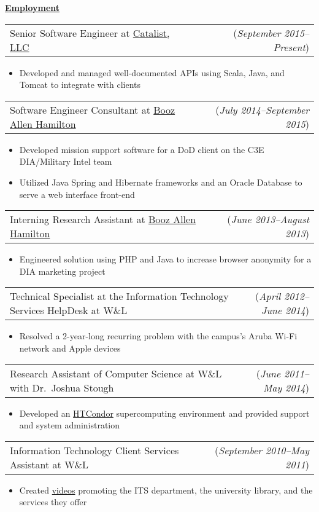 \documentclass[11pt, letterpaper]{letter}
\makeatletter
\newlength{\indwidth}            \setlength{\indwidth}{\textwidth-.4in}
\newlength{\listSpacing}         \setlength{\listSpacing}{.0375in}
\newlength{\headerAntispace}     \setlength{\headerAntispace}{-6pt}
\newlength{\subListAntispace}    \setlength{\subListAntispace}{-.25in}
\newlength{\subListMidAntispace} \setlength{\subListMidAntispace}{-2.5pt}
\newlength{\subListEndAntispace} \setlength{\subListEndAntispace}{-.075in}
\newcommand{\lst}[1]{
    \vspace{\subListAntispace}
    \begin{itemize}
        \item #1
    \end{itemize}
    \vspace{\subListEndAntispace}
}
\newcommand{\dated}[2]{
    \begin{tabular*}{\indwidth}{l@{\extracolsep{\fill}}r}
        #1 & (\textit{#2})
    \end{tabular*}
}
\newcommand{\datedTwo}[3]{
    \begin{tabular*}{\indwidth}{l@{\extracolsep{\fill}}r}
        #1 & (\textit{#2}) (\textit{#3})
    \end{tabular*}
}
\newcommand{\myul}[3]{
    \begingroup
        \renewcommand{\ULdepth}{#1}
        \renewcommand{\ULthickness}{#2}
        \uline{#3}
    \endgroup
}
\newcommand{\sectionheader}[1]{
    \myul{2.7pt}{0.5pt}{\large \textbf{#1}}
}
\newcommand{\BAHlink}{\href{https://www.boozallen.com/}{Booz Allen Hamilton}}
\makeatother
\begin{document}

\sectionheader{Employment}
\vspace{\headerAntispace}
\begin{itemize}{%
    \setlength{\itemsep}{\listSpacing}
    \item \dated{Senior Software Engineer at \href{https://catalist.us/}{Catalist, LLC}}{September 2015--Present}
    \lst{%
        Developed and managed well-documented APIs using Scala, Java, and Tomcat to integrate with clients
    }
    \item \dated{%
            Software Engineer Consultant at \BAHlink{}
    }{July 2014--September 2015}
    \lst{%
        Developed mission support software for a DoD client on the C3E DIA/Military Intel team
    \vspace{\subListMidAntispace}
    \item {%
        Utilized Java Spring and Hibernate frameworks and an Oracle Database to serve a web interface front-end
    }
    \vspace{\subListMidAntispace}
    }
    \item \dated{%
        Interning Research Assistant at \BAHlink{}
    }{June 2013--August 2013}
    \lst{%
        Engineered solution using PHP and Java to increase browser anonymity for a DIA marketing project
    }
    \item \dated{%
        Technical Specialist at the Information Technology Services HelpDesk at W\&L
    }{April 2012--June 2014}
    \lst{%
        Resolved a 2-year-long recurring problem with the campus's Aruba Wi-Fi network and Apple devices
    }
    \item \dated{%
        Research Assistant of Computer Science at W\&L with Dr.\ Joshua Stough
    }{June 2011--May 2014}
    \lst{%
        Developed an \href{http://www.htcondorproject.org/}{HTCondor} supercomputing environment and provided support
        and system administration
    }
    \item \dated{%
        Information Technology Client Services Assistant at W\&L
    }{September 2010--May 2011}
    \lst{%
        Created \href{http://youtu.be/NvOarFOmly0?hd=1}{videos} promoting the ITS department, the university library,
        and the services they offer
    }
    \iftoggle{smithbros}{%
        \item \datedTwo{%
            File Digitizer at Smith Brothers Abstract and Title Co.
        }{June 2009--August 2009}{June 2010--August 2010}
    }{}
}\end{itemize}
\end{document}
